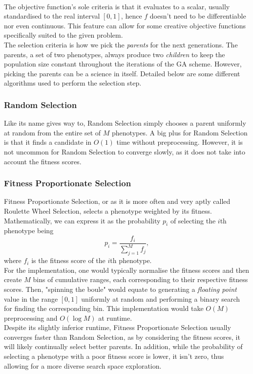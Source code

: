\\
The objective function's sole criteria is that it evaluates to a scalar, usually standardised to the real interval $[0,1]$, hence $f$ doesn't need to be differentiable nor even continuous. This feature can allow for some creative objective functions specifically suited to the given problem.
\\
The selection criteria is how we pick the \textit{parents} for the next generations. The parents, a set of two phenotypes, always produce two \textit{children} to keep the population size constant throughout the iterations of the GA scheme. However, picking the parents can be a science in itself. Detailed below are some different algorithms used to perform the selection step.

\subsubsection{Random Selection}
Like its name gives way to, Random Selection simply chooses a parent uniformly at random from the entire set of $M$ phenotypes. A big plus for Random Selection is that it finds a candidate in $O(1)$ time without preprocessing. However, it is not uncommon for Random Selection to converge slowly, as it does not take into account the fitness scores. 

\subsubsection{Fitness Proportionate Selection}
Fitness Proportionate Selection, or as it is more often and very aptly called Roulette Wheel Selection, selects a phenotype weighted by its fitness. Mathematically, we can express it as the probability $p_i$ of selecting the $i$th phenotype being
\begin{equation*}
    p_i = \frac{f_i}{\sum_{j = 1}^M f_j},
\end{equation*}
where $f_i$ is the fitness score of the $i$th phenotype.
\\
For the implementation, one would typically normalise the fitness scores and then create $M$ bins of cumulative ranges, each corresponding to their respective fitness scores. Then, "spinning the boule" would equate to generating a \textit{floating point} value in the range $[0,1]$ uniformly at random and performing a binary search for finding the corresponding bin. This implementation would take $O(M)$ preprocessing and $O(\log M )$ at runtime. 
\\
Despite its slightly inferior runtime, Fitness Proportionate Selection usually converges faster than Random Selection, as by considering the fitness scores, it will likely continually select better parents. In addition, while the probability of selecting a phenotype with a poor fitness score is lower, it isn't zero, thus allowing for a more diverse search space exploration.   

